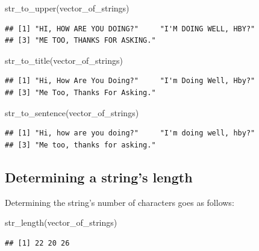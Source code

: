 \documentclass[
]{book}
\newenvironment{Shaded}{\begin{snugshade}}{\end{snugshade}}
\newcommand{\FunctionTok}[1]{\textcolor[rgb]{0.00,0.00,0.00}{#1}}
\newcommand{\NormalTok}[1]{#1}
\begin{document}
\begin{Shaded}
\begin{Highlighting}[]
\FunctionTok{str\_to\_upper}\NormalTok{(vector\_of\_strings)}
\end{Highlighting}
\end{Shaded}

\begin{verbatim}
## [1] "HI, HOW ARE YOU DOING?"     "I'M DOING WELL, HBY?"      
## [3] "ME TOO, THANKS FOR ASKING."
\end{verbatim}

\begin{Shaded}
\begin{Highlighting}[]
\FunctionTok{str\_to\_title}\NormalTok{(vector\_of\_strings)}
\end{Highlighting}
\end{Shaded}

\begin{verbatim}
## [1] "Hi, How Are You Doing?"     "I'm Doing Well, Hby?"      
## [3] "Me Too, Thanks For Asking."
\end{verbatim}

\begin{Shaded}
\begin{Highlighting}[]
\FunctionTok{str\_to\_sentence}\NormalTok{(vector\_of\_strings)}
\end{Highlighting}
\end{Shaded}

\begin{verbatim}
## [1] "Hi, how are you doing?"     "I'm doing well, hby?"      
## [3] "Me too, thanks for asking."
\end{verbatim}

\hypertarget{determining-a-strings-length}{%
\subsection{Determining a string's length}\label{determining-a-strings-length}}

Determining the string's number of characters goes as follows:

\begin{Shaded}
\begin{Highlighting}[]
\FunctionTok{str\_length}\NormalTok{(vector\_of\_strings)}
\end{Highlighting}
\end{Shaded}

\begin{verbatim}
## [1] 22 20 26
\end{verbatim}
\end{document}
